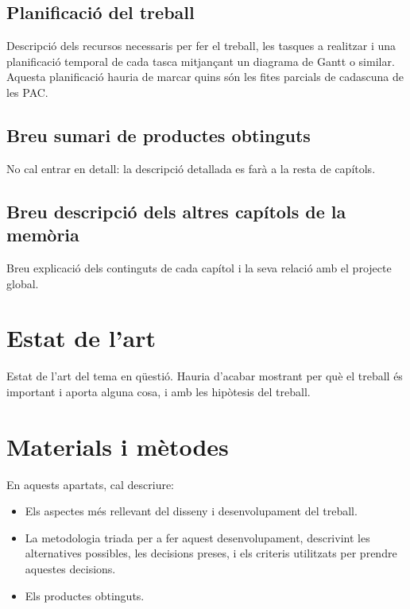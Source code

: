 \documentclass[CAT,BIB]{TFUOC}%
\begin{document}
\section{Planificació del treball}

Descripció dels recursos necessaris per fer el treball, les tasques a realitzar i una planificació temporal de cada tasca mitjançant un diagrama de Gantt o similar. Aquesta planificació hauria de marcar quins són les fites parcials de cadascuna de les PAC.



\section{Breu sumari de productes obtinguts}

No cal entrar en detall: la descripció detallada es farà a la resta de capítols.


\section{Breu descripció dels altres capítols de la memòria}

Breu explicació dels continguts de cada capítol i la seva relació amb el projecte global.

\chapter{Estat de l'art}

Estat de l'art del tema en qüestió.
Hauria d'acabar mostrant per què el treball és important i aporta alguna cosa, i amb les hipòtesis del treball.


\chapter{Materials i mètodes}
En aquests apartats, cal descriure:
\begin{itemize}
    \item Els aspectes més rellevant del disseny i desenvolupament del treball.
    \item La metodologia triada per a fer aquest desenvolupament, descrivint les alternatives possibles, les decisions preses, i els criteris utilitzats per prendre aquestes decisions.
    \item Els productes obtinguts.
\end{itemize}
\end{document}
